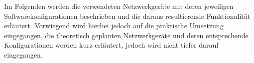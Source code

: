 Im Folgenden werden die verwendeten Netzwerkgeräte mit deren jeweiligen Softwarekonfigurationen beschrieben und die daraus resultierende Funktionalität erläutert. 
Vorwiegend wird hierbei jedoch auf die praktische Umsetzung eingegangen, die theoretisch geplanten Netzwerkgeräte und deren entsprechende Konfigurationen werden kurz erläutert, 
jedoch wird nicht tiefer darauf eingegangen.